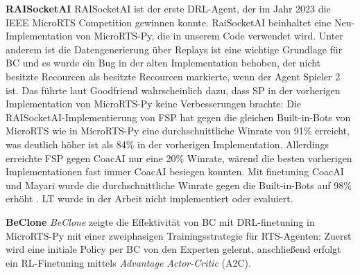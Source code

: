 \documentclass[10pt,twocolumn,letterpaper]{article}
\begin{document}
\noindent\textbf{RAISocketAI}
\cite{goodfriend2024raisocketai} RAISocketAI ist der erste DRL-Agent, der im Jahr 2023 die IEEE MicroRTS Competition gewinnen konnte. 
RaiSocketAI beinhaltet eine Neu-Implementation von MicroRTS-Py, die in unserem Code verwendet wird. 
Unter anderem ist die Datengenerierung über Replays ist eine wichtige Grundlage für BC \cite{huft2023microrts} und es wurde ein Bug in der alten Implementation behoben, der nicht besitzte Recourcen als besitzte Recourcen markierte, wenn der Agent Spieler 2 ist. 
Das führte laut Goodfriend wahrscheinlich dazu, dass SP in der vorherigen Implementation von MicroRTS-Py keine Verbesserungen brachte:
Die RAISocketAI-Implementierung von FSP hat gegen die gleichen Built-in-Bots von MicroRTS wie in MicroRTS-Py eine durchschnittliche Winrate von 91\% erreicht, was deutlich höher ist als 84\% in der vorherigen Implementation. 
Allerdings erreichte FSP gegen CoacAI nur eine 20\% Winrate, wärend die besten vorherigen Implementationen fast immer CoacAI besiegen konnten.
Mit finetuning CoacAI und Mayari wurde die durchschnittliche Winrate gegen die Built-in-Bots auf 98\% erhöht \cite{goodfriend2024raisocketai}.
LT wurde in der Arbeit nicht implementiert oder evaluiert.
\vspace{10pt}

\noindent\textbf{BeClone}
\cite{martin2021beclone} \emph{BeClone} zeigte die Effektivität von BC mit DRL-finetuning in MicroRTS-Py mit einer zweiphasigen Trainingsstrategie für RTS-Agenten: Zuerst wird eine initiale Policy per BC von den Experten gelernt, anschließend erfolgt ein RL-Finetuning mittels \emph{Advantage Actor-Critic} (A2C).
\vspace{10pt}
\end{document}
